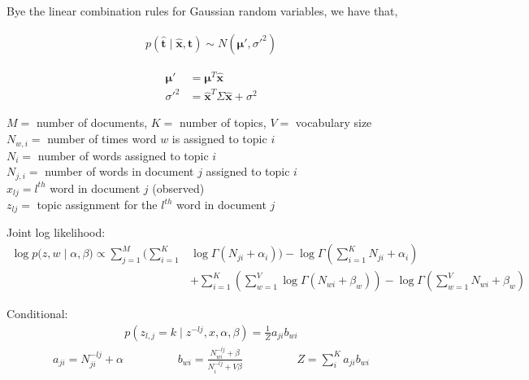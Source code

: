\documentclass[10pt]{homeworg}
\begin{document}
Bye the linear combination rules for Gaussian random variables, we have that,

\begin{align*}
p(\hat{\boldsymbol t} \mid \hat{\boldsymbol x}, \boldsymbol t) \sim N(\boldsymbol \mu', \sigma'^2)
\end{align*}

\vspace{-1cm}

\begin{align*}
\boldsymbol \mu' &= \boldsymbol \mu^T\hat{\boldsymbol x}\\
\sigma'^2 &= \hat{\boldsymbol x}^T \Sigma \hat{\boldsymbol x} + \sigma^2
\end{align*}

\exercise
$M = $ number of documents, $K = $ number of topics, $V = $ vocabulary size\\
$N_{w,i} = $ number of times word $w$ is assigned to topic $i$\\
$N_i = $ number of words assigned to topic $i$\\
$N_{j,i} = $ number of words in document $j$ assigned to topic $i$\\
$x_{lj} = l^{th}$ word in document $j$ (observed)\\
$z_{lj} = $ topic assignment for the $l^{th}$ word in document $j$

 
Joint log likelihood:
\begin{align*}
\log{p(z,w \mid \alpha, \beta}) \propto \sum_{j=1}^M (\sum_{i=1}^K &\log{\Gamma(N_{ji} + \alpha_i)}) - \log{\Gamma(\sum_{i=1}^K N_{ji} + \alpha_i)}\\
& + \sum_{i=1}^K (\sum_{w=1}^V \log{\Gamma(N_{wi} + \beta_w)}) - \log{\Gamma(\sum_{w=1}^V N_{wi} + \beta_w)}
\end{align*}

Conditional:
\begin{align*}
p(z_{l,j} = k \mid z^{-lj}, x, \alpha, \beta) = \frac{1}{Z} a_{ji} b_{wi}
\end{align*}
\vspace{-0.5cm}
\begin{align*}
a_{ji} = N_{ji}^{-lj} + \alpha   \hspace{2cm}  b_{wi} = \frac{N_{wi}^{-lj} + \beta}{N_i^{-lj} + V\beta}  \hspace{2cm} Z = \sum_i^K a_{ji}b_{wi}
\end{align*}
\end{document}
